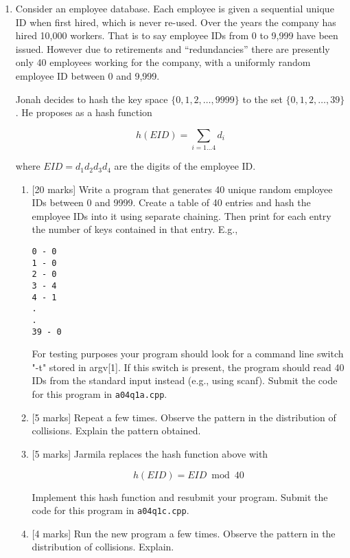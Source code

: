 \documentclass[11pt]{article}
\begin{document}
\begin{enumerate}
\item Consider an employee database. 
Each employee is given a sequential unique ID when first hired, which is never re-used. 
Over the years the company has hired 10,000 workers. 
That is to say employee IDs from 0 to 9,999 have been issued. 
However due to retirements and ``redundancies'' there are presently only 40 employees working for the company, with a uniformly random employee ID between 0 and 9,999. 

Jonah decides to hash the key space  $\{0,1,2,\ldots,9999\}$ to the set $\{0,1,2,\ldots,39\}$. 
He proposes as a hash function 

\[ h(EID)=\sum_{i=1 \ldots 4} d_i\]

where $EID=d_1d_2d_3d_4$ are the digits of the employee ID. 

\begin{enumerate}
\item {[20 marks]}   
Write a program that generates 40 unique random employee IDs between 0 and 9999. 
Create a table of 40 entries and hash the employee IDs into it using separate chaining. 
Then print for each entry the number of keys contained in that entry. 
E.g.,

\begin{verbatim}
0 - 0
1 - 0
2 - 0
3 - 4
4 - 1
.
.
39 - 0
\end{verbatim}

For testing purposes your program should look for a command line switch "-t" stored in argv{[1]}.
If this switch is present, the program should read 40 IDs from the standard input instead (e.g., using scanf).
Submit the code for this program in {\tt a04q1a.cpp}.

\item {[5 marks]}  
Repeat a few times. 
Observe the pattern in the distribution of collisions. 
Explain the pattern obtained.

\item {[5 marks]} 
Jarmila replaces the hash function above with 

\[ h(EID) = EID \bmod 40\]

Implement this hash function and resubmit your program.
Submit the code for this program in {\tt a04q1c.cpp}.

\item {[4 marks]} 
Run the new program a few times. 
Observe the pattern in the distribution of collisions. 
Explain.
\end{enumerate}


\end{enumerate}
\end{document}

